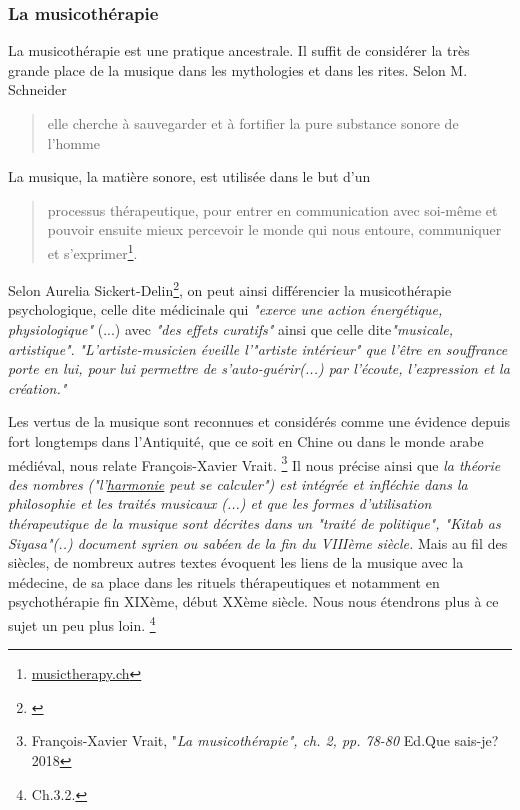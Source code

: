  



\subsubsection{La musicothérapie}
La musicothérapie est une pratique ancestrale. Il suffit de considérer la très grande  place de la musique dans les mythologies et dans les rites.  Selon M. Schneider
\begin{quote}
	elle cherche à sauvegarder et à fortifier la pure substance sonore de l'homme\autocite[Voir tome I, pp. 202--203]%
	[M. Schneider, <<\,Le rôle  de la musique dans la mythologie et les rites des civilisations non européennes\,>>]{schaeffner.ea:histoire}
\end{quote}

La musique, la matière sonore, est utilisée dans le but d'un 
\begin{quote}
	processus thérapeutique, pour entrer en communication avec soi-même et pouvoir ensuite mieux percevoir le monde qui nous
	entoure, communiquer et s'exprimer\footnote{%
		\href{http://www.musictherapy.ch/fr/musicotherapie/quest-ce-que-la-musicotherapie/}{musictherapy.ch}}.
\end{quote}

 Selon Aurelia Sickert-Delin\footnote{\autocite[ch. 1,  p. 14, du texte inédit communiqué par A. Sickert-Delin, musicothérapeute à Alersheim, à J.Viret]{viret:b}}, on peut ainsi différencier la musicothérapie psychologique, celle dite médicinale qui \emph{"exerce une action énergétique, physiologique" }(...) avec \emph{"des effets curatifs"}  ainsi que celle dite\emph{"musicale, artistique"}. 
 	 \emph{"L'artiste-musicien éveille l'"artiste intérieur" que l'être en souffrance porte en lui, pour lui permettre de s'auto-guérir(...) par l'écoute, l'expression et la création."}
 	 
 	 
Les vertus de la musique sont reconnues et considérés comme une évidence depuis fort longtemps dans l'Antiquité, que ce soit en Chine ou dans le monde arabe médiéval, nous relate François-Xavier Vrait.
 \footnote{François-Xavier Vrait, "\textit{La musicothérapie", ch. 2, pp. 78-80} Ed.Que sais-je? 2018} 
 Il nous précise ainsi que \emph{ la théorie des nombres ("l'\underline{harmonie} peut se calculer") est intégrée et infléchie dans la philosophie et les traités musicaux (...) et que les formes d'utilisation thérapeutique de la musique sont décrites dans un "traité de politique", "Kitab as Siyasa"(..) document syrien ou sabéen de la fin du VIIIème siècle.} Mais au fil des siècles, de nombreux autres textes évoquent les liens de la musique avec la médecine, de sa place dans les rituels thérapeutiques et notamment en psychothérapie fin XIXème, début XXème siècle. Nous nous étendrons plus à ce sujet un peu plus loin. \footnote{Ch.3.2.}
 
